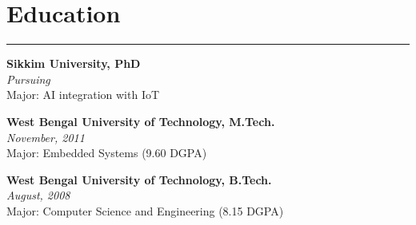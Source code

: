 \documentclass[10pt]{article}
\begin{document}
	\vspace*{-5mm}	

    
    \section*{Education}
    \vspace*{-2.5mm}
    \hrule 
    \vspace*{2mm}
 
\noindent     \textbf{Sikkim University, PhD}\\
 \textit{Pursuing}\\
 Major: AI integration with IoT\\
    
 \vspace*{-2mm}
 
 \noindent    \textbf{West Bengal University of Technology, M.Tech.}\\
    \textit{November, 2011}\\
    Major: Embedded Systems (9.60 DGPA)\\
    
   
    \vspace*{-2mm}
    
    \noindent
    \textbf{West Bengal University of Technology, B.Tech.}\\
    \textit{August, 2008}\\
    Major: Computer Science and Engineering (8.15 DGPA)\\
    
    
     
  \vspace*{-7mm}
       		
    
    
    


	
\end{document}
